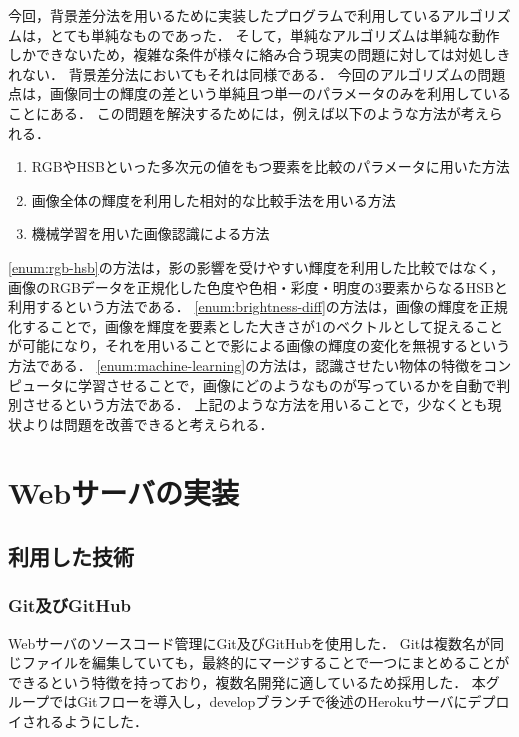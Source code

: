 \documentclass[../report]{subfiles}
\begin{document}
今回，背景差分法を用いるために実装したプログラムで利用しているアルゴリズムは，とても単純なものであった．
そして，単純なアルゴリズムは単純な動作しかできないため，複雑な条件が様々に絡み合う現実の問題に対しては対処しきれない．
背景差分法においてもそれは同様である．
今回のアルゴリズムの問題点は，画像同士の輝度の差という単純且つ単一のパラメータのみを利用していることにある．
この問題を解決するためには，例えば以下のような方法が考えられる．
\begin{enumerate}
    \item \label{enum:rgb-hsb} RGBやHSBといった多次元の値をもつ要素を比較のパラメータに用いた方法
    \item \label{enum:brightness-diff} 画像全体の輝度を利用した相対的な比較手法を用いる方法
    \item \label{enum:machine-learning} 機械学習を用いた画像認識による方法
\end{enumerate}
\ref{enum:rgb-hsb}の方法は，影の影響を受けやすい輝度を利用した比較ではなく，画像のRGBデータを正規化した色度や色相・彩度・明度の3要素からなるHSBと利用するという方法である．
\ref{enum:brightness-diff}の方法は，画像の輝度を正規化することで，画像を輝度を要素とした大きさが1のベクトルとして捉えることが可能になり，それを用いることで影による画像の輝度の変化を無視するという方法である．
\ref{enum:machine-learning}の方法は，認識させたい物体の特徴をコンピュータに学習させることで，画像にどのようなものが写っているかを自動で判別させるという方法である．
上記のような方法を用いることで，少なくとも現状よりは問題を改善できると考えられる．


\section{Webサーバの実装}
\subsection{利用した技術}
\subsubsection{Git及びGitHub}
Webサーバのソースコード管理にGit及びGitHubを使用した．
Gitは複数名が同じファイルを編集していても，最終的にマージすることで一つにまとめることができるという特徴を持っており，複数名開発に適しているため採用した．
本グループではGitフローを導入し，developブランチで後述のHerokuサーバにデプロイされるようにした．
\end{document}
